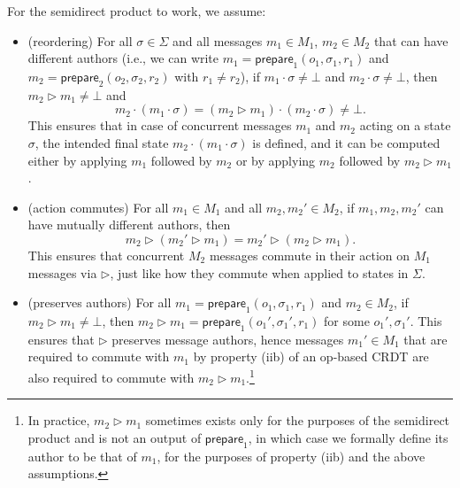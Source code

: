 \documentclass[acmsmall,nonacm,12pt]{acmart}
\newcommand{\msf}[1]{\ensuremath{\mathsf{#1}}}
\newcommand{\act}{\triangleright}
\theoremstyle{plain}
\theoremstyle{definition}
\begin{document}
For the semidirect product to work, we assume:
\begin{itemize}
  \item (reordering) For all $\sigma \in \Sigma$ and all messages $m_1 \in M_1$, $m_2 \in M_2$ that can have different authors (i.e., we can write $m_1 = \msf{prepare}_1(o_1, \sigma_1, r_1)$ and $m_2 = \msf{prepare}_2(o_2, \sigma_2, r_2)$ with $r_1 \neq r_2$), if $m_1 \cdot \sigma \neq \bot$ and $m_2 \cdot \sigma \neq \bot$, then $m_2 \act m_1 \neq \bot$ and
  \[
  m_2 \cdot (m_1 \cdot \sigma) = (m_2 \act m_1) \cdot (m_2 \cdot \sigma) \neq \bot.
  \]
  This ensures that in case of concurrent messages $m_1$ and $m_2$ acting on a state $\sigma$, the intended final state $m_2 \cdot (m_1 \cdot \sigma)$ is defined, and it can be computed either by applying $m_1$ followed by $m_2$ or by applying $m_2$ followed by $m_2 \act m_1$.
  \item (action commutes) For all $m_1 \in M_1$ and all $m_2, m_2' \in M_2$, if $m_1, m_2, m_2'$ can have mutually different authors, then
  \[
  m_2 \act (m_2' \act m_1) = m_2' \act (m_2 \act m_1).
  \]
  This ensures that concurrent $M_2$ messages commute in their action on $M_1$ messages via $\act$, just like how they commute when applied to states in $\Sigma$.
  \item (preserves authors) For all $m_1 = \msf{prepare}_1(o_1, \sigma_1, r_1)$ and $m_2 \in M_2$, if $m_2 \act m_1 \neq \bot$, then $m_2 \act m_1 = \msf{prepare}_1( o_1', \sigma_1', r_1)$ for some $o_1', \sigma_1'$.  This ensures that $\act$ preserves message authors, hence messages $m_1' \in M_1$ that are required to commute with $m_1$ by property (iib) of an op-based CRDT are also required to commute with $m_2 \act m_1$.\footnote{In practice, $m_2 \act m_1$ sometimes exists only for the purposes of the semidirect product and is not an output of $\msf{prepare}_1$, in which case we formally define its author to be that of $m_1$, for the purposes of property (iib) and the above assumptions.}
\end{itemize}
\end{document}
